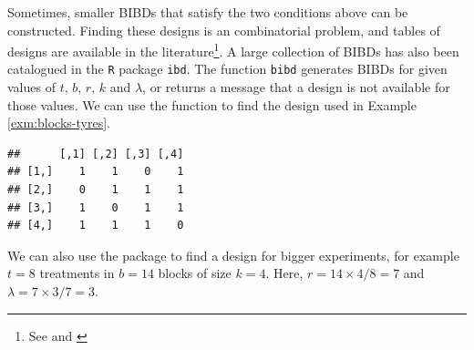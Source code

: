 \documentclass[
]{book}
\newenvironment{Shaded}{\begin{snugshade}}{\end{snugshade}}
\newcommand{\AttributeTok}[1]{\textcolor[rgb]{0.77,0.63,0.00}{#1}}
\newcommand{\CommentTok}[1]{\textcolor[rgb]{0.56,0.35,0.01}{\textit{#1}}}
\newcommand{\DecValTok}[1]{\textcolor[rgb]{0.00,0.00,0.81}{#1}}
\newcommand{\FunctionTok}[1]{\textcolor[rgb]{0.00,0.00,0.00}{#1}}
\newcommand{\NormalTok}[1]{#1}
\newcommand{\OtherTok}[1]{\textcolor[rgb]{0.56,0.35,0.01}{#1}}
\newcommand{\SpecialCharTok}[1]{\textcolor[rgb]{0.00,0.00,0.00}{#1}}
\theoremstyle{definition}
\theoremstyle{definition}
\theoremstyle{definition}
\theoremstyle{definition}
\theoremstyle{remark}
\begin{document}
Sometimes, smaller BIBDs that satisfy the two conditions above can be constructed. Finding these designs is an combinatorial problem, and tables of designs are available in the literature\footnote{See \citet{CochranCox1957} and \citet{FisherYates1963}}. A large collection of BIBDs has also been catalogued in the \texttt{R} package \texttt{ibd}. The function \texttt{bibd} generates BIBDs for given values of \(t\), \(b\), \(r\), \(k\) and \(\lambda\), or returns a message that a design is not available for those values. We can use the function to find the design used in Example \ref{exm:blocks-tyres}.

\begin{Shaded}
\end{Shaded}

\begin{verbatim}
##      [,1] [,2] [,3] [,4]
## [1,]    1    1    0    1
## [2,]    0    1    1    1
## [3,]    1    0    1    1
## [4,]    1    1    1    0
\end{verbatim}

We can also use the package to find a design for bigger experiments, for example \(t=8\) treatments in \(b=14\) blocks of size \(k=4\). Here, \(r = 14\times 4 / 8 = 7\) and \(\lambda = 7 \times 3 / 7 = 3\).

\begin{Shaded}
\end{Shaded}
\end{document}
